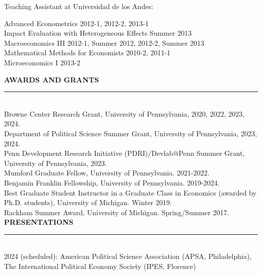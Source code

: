 \documentclass[10pt, english]{article}
\begin{document}
\vspace{-0.25cm}
Teaching Assistant at Universidad de los Andes:
\vspace{-0.2cm}
\begin{flushright}
\begin{minipage}{0.95\textwidth}
Advanced Econometrics \hfill 2012-1, 2012-2, 2013-1\\
Impact Evaluation with Heterogeneous Effects \hfill Summer 2013\\
Macroeconomics III \hfill 2012-1, Summer 2012, 2012-2, Summer 2013\\
Mathematical Methods for Economists \hfill 2010-2, 2011-1\\	
Microeconomics I \hfill 2013-2\\
\end{minipage}
\end{flushright}

\vspace{0.2cm}
\textbf{AWARDS AND GRANTS}

\noindent\rule{\textwidth}{1pt}\\

Browne Center Research Grant, University of Pennsylvania, 2020, 2022, 2023, 2024.\\

Department of Political Science Summer Grant, University of Pennsylvania, 2023, 2024.\\

Penn Development Research Initiative (PDRI)/Devlab$@$Penn Summer Grant, University of Pennsylvania, 2023.\\

Mumford Graduate Fellow, University of Pennsylvania. 2021-2022.\\

Benjamin Franklin Fellowship, University of Pennsylvania. 2019-2024.\\

Best Graduate Student Instructor in a Graduate Class in Economics (awarded by Ph.D. students), University of Michigan. Winter 2019.\\

Rackham Summer Award, University of Michigan. Spring/Summer 2017.\\

\vspace{0.2cm}
\textbf{PRESENTATIONS}

\noindent\rule{\textwidth}{1pt}\\

2024 (scheduled): American Political Science Association (APSA, Philadelphia), The International Political Economy Society (IPES, Florence)\\
\end{document}
